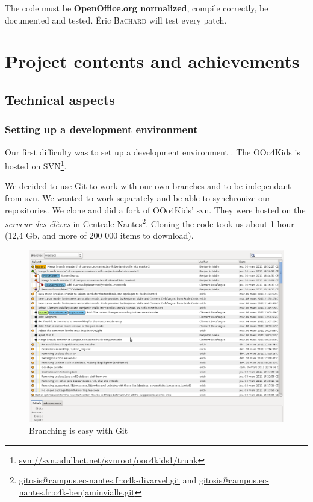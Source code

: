 \documentclass[a4paper,11pt]{article}
\begin{document}
The code must be  \textbf{OpenOffice.org normalized}, compile correctly, be
documented and tested. Éric \textsc{Bachard} will test every patch.

\newpage

\fancyfoot[C]{\thepage}
\section*{Project contents and achievements}

\subsection*{Technical aspects}

\subsubsection*{Setting up a development environment}


Our first difficulty was to set up a development environment . The OOo4Kids is
hosted on SVN\footnote{\url{svn://svn.adullact.net/svnroot/ooo4kids1/trunk}}.

We decided to use Git to work with our own branches and to be independant from
svn. We wanted to work separately and be able to synchronize our repositories.
We clone and did a fork of OOo4Kids' svn. They were hosted on the
\emph{serveur des élèves} in Centrale
Nantes\footnote{\url{gitosis@campus.ec-nantes.fr:o4k-divarvel.git} and
\url{gitosis@campus.ec-nantes.fr:o4k-benjaminvialle.git}}.  Cloning the code
took us about 1 hour (12,4 Gb, and more of 200 000 items to download).
   
\begin{figure}[!h]
\centering
\includegraphics[scale=0.3]{images/Gitg.png}
\caption{Branching is easy with Git}
\end{figure}   
   
\end{document}
